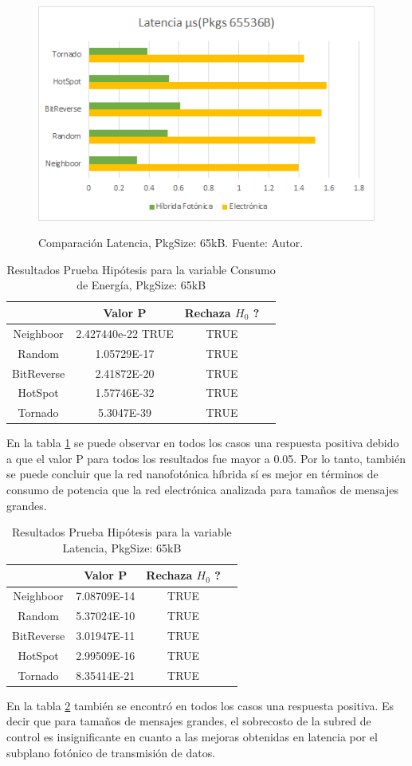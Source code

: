 \begin{figure}[H]
\caption{Comparación Latencia, PkgSize: 65kB. Fuente: Autor.}
\centering
\includegraphics[width=1.0\textwidth,natwidth=483,natheight=306]{figs/L65k.png}
\label{fig:l65k}
\end{figure} 

\begin{table}[H]
\centering
\begin{tabular}{|c|c|c|c|}
\hline
&Valor P&Rechaza $H_0$ ?\\
\hline
Neighboor&2.427440e-22 TRUE&TRUE\\
Random&1.05729E-17&TRUE\\
BitReverse&2.41872E-20&TRUE\\
HotSpot&1.57746E-32&TRUE\\
Tornado&5.3047E-39&TRUE\\
\hline
\end{tabular}
\caption{Resultados Prueba Hipótesis para la variable Consumo de Energía, PkgSize: 65kB}
\label{tb:ettest65k}
\end{table}

En la tabla \ref{tb:ettest65k} se puede observar en todos los casos una
respuesta positiva debido a que el valor P para
todos los resultados fue mayor a 0.05. Por lo tanto, también se puede concluir que 
la red nanofotónica híbrida sí es mejor en términos de consumo de potencia
que la red electrónica analizada para tamaños de mensajes grandes.

\begin{table}[H]
\centering
\begin{tabular}{|c|c|c|c|}
\hline
&Valor P&Rechaza $H_0$ ?\\
\hline
Neighboor&7.08709E-14&TRUE\\
Random&5.37024E-10&TRUE\\
BitReverse&3.01947E-11&TRUE\\
HotSpot&2.99509E-16&TRUE\\
Tornado&8.35414E-21&TRUE\\
\hline
\end{tabular}
\caption{Resultados Prueba Hipótesis para la variable Latencia, PkgSize: 65kB}
\label{tb:lttest65k}
\end{table}

En la tabla \ref{tb:lttest65k} también se encontró en todos los casos una
respuesta positiva. Es decir que para tamaños de mensajes grandes, el sobrecosto
de la subred de control es insignificante en cuanto a las mejoras obtenidas
en latencia por el subplano fotónico de transmisión de datos.

